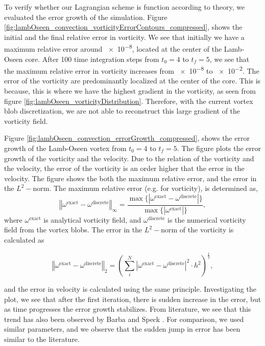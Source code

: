 To verify whether our Lagrangian scheme is function according to theory, we evaluated the error growth of the simulation. Figure \ref{fig:lambOseen_convection_vorticityErrorContours_compressed}, shows the initial and the final relative error in vorticity. We see that initially we have a maximum relative error around \num{e-8}, located at the center of the Lamb-Oseen core. After 100 time integration steps from $t_0=4$ to $t_f=5$, we see that the maximum relative error in vorticity increases from \num{e-8} to \num{e-2}. The error of the vorticity are predominantly localized at the center of the core. This is because, this is where we have the highest gradient in the vorticity, as seen from figure \ref{fig:lambOseen_vorticityDistribution}. Therefore, with the current vortex blob discretization, we are not able to reconstruct this large gradient of the vorticity field. 

Figure \ref{fig:lambOseen_convection_errorGrowth_compressed}, shows the error growth of the Lamb-Oseen vortex from $t_0=4$ to $t_f=5$. The figure plots the error growth of the vorticity and the velocity. Due to the relation of the vorticity and the velocity, the error of the vorticity is an order higher that the error in the velocity. The figure shows the both the maximum relative error, and the error in the $L^2-\mathrm{norm}$. The maximum relative error (e.g. for vorticity), is determined as,
	\begin{equation}
	\left\Vert \omega^{\mathrm{exact}} - \omega^{\mathrm{discrete}} \right\Vert_{\infty} = \frac{\max\{\left|\omega^{\mathrm{exact}} - \omega^{\mathrm{discrete}}\right|\}}{\max\{\left|\omega^{\mathrm{exact}}\right|\}},
	\end{equation}
where $\omega^{\mathrm{exact}}$ is analytical vorticity field, and $\omega^{\mathrm{discrete}}$ is the numerical vorticity field from the vortex blobs. The error in the $L^2-\mathrm{norm}$ of the vorticity is calculated as 

	\begin{equation}
	\left\Vert \omega^{\mathrm{exact}} - \omega^{\mathrm{discrete}} \right\Vert_2 = \left(\sum_{i}^{N}\left| \omega^{\mathrm{exact}} - \omega^{\mathrm{discrete}} \right|^2 \cdot h^2\right)^{\frac{1}{2}},
	\end{equation}

and the error in velocity is calculated using the same principle. Investigating the plot, we see that after the first iteration, there is sudden increase in the error, but as time progresses the error growth stabilizes. From literature, we see that this trend has also been observed by Barba \cite{Barba2004c} and Speck \cite{Speck2011a}. For comparison, we used similar parameters, and we observe that the sudden jump in error has been similar to the literature.
	
